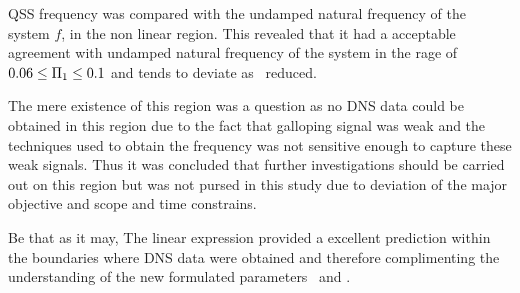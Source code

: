 QSS frequency was compared with the undamped natural frequency of the system $f$, in the non linear region. This revealed that it had a acceptable agreement with undamped natural frequency of the system in the rage of $0.06\leq\Pi_1\leq0.1$ and tends to deviate as \massstiff\ reduced. 

The mere existence of this region was a question as no DNS data could be obtained in this region due to the fact that galloping signal was weak and the techniques used to obtain the  frequency was not sensitive enough to capture these weak signals. Thus it was concluded that further investigations should be carried out on this region but was not pursed in this study due to deviation of the major objective and scope and time constrains.

Be that as it may, The linear expression provided a excellent prediction within the boundaries where DNS data were obtained and therefore complimenting the understanding of the new formulated parameters \massstiff\ and \massdamp.    




